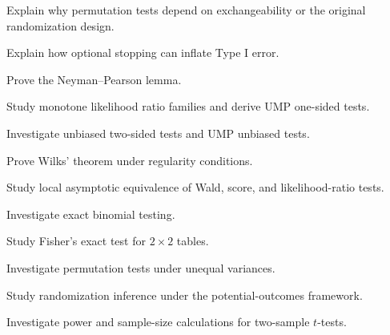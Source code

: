 \begin{exercise}[3]
Explain why permutation tests depend on exchangeability or the original
randomization design.
\end{exercise}

\begin{exercise}[3]
Explain how optional stopping can inflate Type I error.
\end{exercise}

\begin{exercise}[4]
Prove the Neyman--Pearson lemma.
\end{exercise}

\begin{exercise}[4]
Study monotone likelihood ratio families and derive UMP one-sided tests.
\end{exercise}

\begin{exercise}[4]
Investigate unbiased two-sided tests and UMP unbiased tests.
\end{exercise}

\begin{exercise}[4]
Prove Wilks' theorem under regularity conditions.
\end{exercise}

\begin{exercise}[4]
Study local asymptotic equivalence of Wald, score, and likelihood-ratio
tests.
\end{exercise}

\begin{exercise}[4]
Investigate exact binomial testing.
\end{exercise}

\begin{exercise}[4]
Study Fisher's exact test for \(2\times2\) tables.
\end{exercise}

\begin{exercise}[4]
Investigate permutation tests under unequal variances.
\end{exercise}

\begin{exercise}[4]
Study randomization inference under the potential-outcomes framework.
\end{exercise}

\begin{exercise}[4]
Investigate power and sample-size calculations for two-sample
\(t\)-tests.
\end{exercise}

